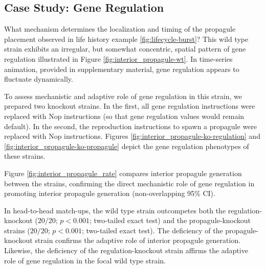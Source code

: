 \subsection{Case Study: Gene Regulation} \label{sec:gene-regulation}



What mechanism determines the localization and timing of the propagule placement observed in life history example \ref{fig:lifecycle-burst}?
This wild type strain exhibits an irregular, but somewhat concentric, spatial pattern of gene regulation illustrated in Figure \ref{fig:interior_propagule-wt}.
In time-series animation, provided in supplementary material, gene regulation appears to fluctuate dynamically.

To assess mechanistic and adaptive role of gene regulation in this strain, we prepared two knockout strains.
In the first, all gene regulation instructions were replaced with Nop instructions (so that gene regulation values would remain default).
In the second, the reproduction instructions to spawn a propagule were replaced with Nop instructions.
Figures \ref{fig:interior_propagule-ko-regulation} and \ref{fig:interior_propagule-ko-propagule} depict the gene regulation phenotypes of these strains.

Figure \ref{fig:interior_propagule_rate} compares interior propagule generation between the strains, confirming the direct mechanistic role of gene regulation in promoting interior propagule generation (non-overlapping 95\% CI).

In head-to-head match-ups, the wild type strain outcompetes both the regulation-knockout ($20/20$; $p < 0.001$; two-tailed exact test) and the propagule-knockout strains
($20/20$; $p < 0.001$; two-tailed exact test).
The deficiency of the propagule-knockout strain confirms the adaptive role of interior propagule generation.
Likewise, the deficiency of the regulation-knockout strain affirms the adaptive role of gene regulation in the focal wild type strain.
